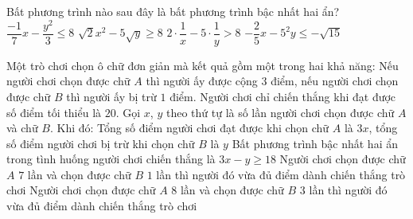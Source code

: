 \begin{ex}
	Bất phương trình nào sau đây là bất phương trình bậc nhất hai ẩn?
	\choice
	{$\dfrac{-1}{7}x-\dfrac{y^2}{3} \le 8$ }
	{$\sqrt{2} x^2-5 \sqrt{y} \ge 8$}
	{$2 \cdot \dfrac{1}{x}-5\cdot \dfrac{1}{y}>8$}
	{\True $-\dfrac{2}{5} x-5^2 y \leq-\sqrt{15}$}
\end{ex}

\begin{ex}
	Một trò chơi chọn ô chữ đơn giản mà kết quả gồm một trong hai khả năng: Nếu người chơi chọn được chữ $A$ thì người ấy được cộng $3$ điểm, nếu người chơi chọn được chữ $B$ thì người ấy bị trừ $1$ điểm. Người chơi chỉ chiến thắng khi đạt được số điểm tối thiểu là $20$. Gọi $x$, $y$ theo thứ tự là số lần người chơi chọn được chữ $A$ và chữ $B$. Khi đó:
	\choiceTF
	{\True Tổng số điểm người chơi đạt được khi chọn chữ $A$ là $3x$, tổng số điểm người chơi bị trừ khi chọn chữ $B$ là $y$}
	{Bất phương trình bậc nhất hai ẩn trong tình huống người chơi chiến thắng là $3x - y \geq 18$}
	{\True Người chơi chọn được chữ $A$ $7$ lần và chọn được chữ $B$ $1$ lần thì người đó vừa đủ điểm dành chiến thắng trò chơi}
	{\True Người chơi chọn được chữ $A$ $8$ lần và chọn được chữ $B$ $3$ lần thì người đó vừa đủ điểm dành chiến thắng trò chơi}
\end{ex}

